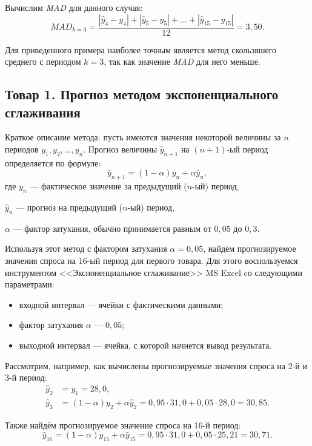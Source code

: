 Вычислим \textit{MAD} для данного случая:
\[
  MAD_{k=3} = \dfrac{|\hat{y}_4 - y_4| + |\hat{y}_5 - y_5| + \dots + |\hat{y}_{15} - y_{15}|}{12} = 3{,}50.
\]

Для приведенного примера наиболее точным является метод скользяшего среднего
с периодом $k = 3$, так как значение \textit{MAD} для него меньше.


\subsection{Товар 1. Прогноз методом экспоненциального сглаживания}

Краткое описание метода: пусть имеются значения некоторой
величины за $n$ периодов $y_1, y_2, \dots, y_n$.
Прогноз величины $\hat{y}_{n+1}$ на $(n+1)\text{-ый}$ период определяется по формуле:
\[
  \hat{y}_{n+1} = (1 - \alpha) y_n + \alpha \hat{y}_n,
\]
где \hspace{2mm} $y_n$ --- фактическое значение за предыдущий ($n$-ый) период, \par
                 $\hat{y}_n$ --- прогноз на предыдущий ($n$-ый) период, \par
                 $\alpha$ --- фактор затухания, обычно принимается равным от $0{,}05$ до $0{,}3$.

Используя этот метод с фактором затухания $\alpha = 0{,}05$,
найдём прогнозируемое значения спроса на 16-ый период
для первого товара. Для этого воспользуемся инструментом
<<Экспоненциальное сглаживание>> MS Excel cо следующими параметрами:
\begin{itemize}
  \item входной интервал --- ячейки с фактическими данными;
  \item фактор затухания $\alpha$ --- $0{,}05$;
  \item выходной интервал --- ячейка, с которой начнется вывод результата.
\end{itemize}

Рассмотрим, например, как вычислены прогнозируемые значения спроса на 2-й и 3-й период:
\begin{align*}
  \hat{y}_2 &= y_1 = 28{,}0, \\
  \hat{y}_3 &= (1 - \alpha) y_2 + \alpha \hat{y}_2 = 0{,}95 \cdot 31{,}0 + 0{,}05 \cdot 28{,}0 = 30{,}85.
\end{align*}

Также найдём прогнозируемое значение спроса на 16-й период:
\begin{equation*}
  \hat{y}_{16} = (1 - \alpha) y_{15} + \alpha \hat{y}_{15}  = 0{,}95 \cdot 31{,}0 + 0{,}05 \cdot 25{,}21 = 30{,}71.
\end{equation*}

